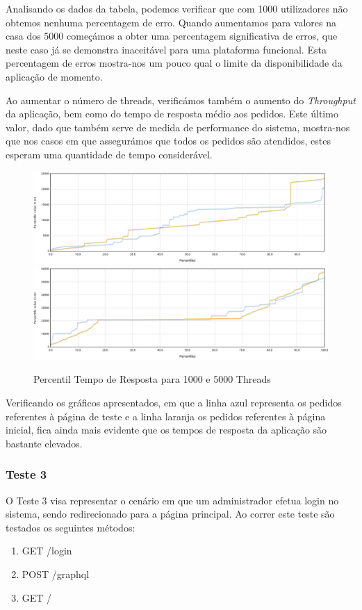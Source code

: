 Analisando os dados da tabela, podemos verificar que com 1000 utilizadores não obtemos nenhuma percentagem de erro. Quando aumentamos para valores na casa dos 5000 começámos a obter uma percentagem significativa de erros, que neste caso já se demonstra inaceitável para uma plataforma funcional. Esta percentagem de erros mostra-nos um pouco qual o limite da disponibilidade da aplicação de momento. 

Ao aumentar o número de threads, verificámos também o aumento do \textit{Throughput} da aplicação, bem como do tempo de resposta médio aos pedidos. Este último valor, dado que também serve de medida de performance do sistema, mostra-nos que nos casos em que assegurámos que todos os pedidos são atendidos, estes esperam uma quantidade de tempo considerável. 

\begin{figure}[ht!]
    \centering
    \includegraphics[width=.45\linewidth]{img/testes/i-t2-1000.png}
    \includegraphics[width=.45\linewidth]{img/testes/i-t2-5000.png}
    \caption{Percentil Tempo de Resposta para 1000 e 5000 Threads}
\end{figure}

Verificando os gráficos apresentados, em que a linha azul representa os pedidos referentes à página de teste e a linha laranja os pedidos referentes à página inicial, fica ainda mais evidente que os tempos de resposta da aplicação são bastante elevados.

\subsubsection{Teste 3}

O Teste 3 visa representar o cenário em que um administrador efetua login no sistema, sendo redirecionado para a página principal. Ao correr este teste são testados os seguintes métodos:

\begin{enumerate}
  \item GET  /login
  \item POST /graphql
  \item GET  /
\end{enumerate}

